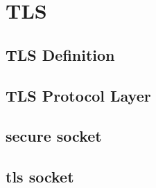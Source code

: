 \chapter{TLS}

\section{TLS Definition}

\section{TLS Protocol Layer}

\section{secure socket}

\section{tls socket}

